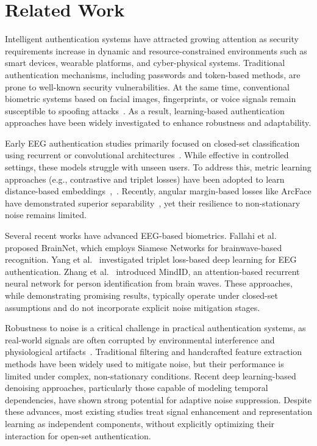 \documentclass[conference]{IEEEtran}
\begin{document}
\section{Related Work}

Intelligent authentication systems have attracted growing attention as security requirements increase in dynamic and resource-constrained environments such as smart devices, wearable platforms, and cyber-physical systems. Traditional authentication mechanisms, including passwords and token-based methods, are prone to well-known security vulnerabilities. At the same time, conventional biometric systems based on facial images, fingerprints, or voice signals remain susceptible to spoofing attacks~\cite{b1}. As a result, learning-based authentication approaches have been widely investigated to enhance robustness and adaptability.

Early EEG authentication studies primarily focused on closed-set classification using recurrent or convolutional architectures~\cite{b3}. While effective in controlled settings, these models struggle with unseen users. To address this, metric learning approaches (e.g., contrastive and triplet losses) have been adopted to learn distance-based embeddings~\cite{b5},~\cite{b6}. Recently, angular margin-based losses like ArcFace have demonstrated superior separability~\cite{b7}, yet their resilience to non-stationary noise remains limited.

Several recent works have advanced EEG-based biometrics. Fallahi et al.~\cite{b1} proposed BrainNet, which employs Siamese Networks for brainwave-based recognition. Yang et al.~\cite{b2} investigated triplet loss-based deep learning for EEG authentication. Zhang et al.~\cite{b3} introduced MindID, an attention-based recurrent neural network for person identification from brain waves. These approaches, while demonstrating promising results, typically operate under closed-set assumptions and do not incorporate explicit noise mitigation stages.

Robustness to noise is a critical challenge in practical authentication systems, as real-world signals are often corrupted by environmental interference and physiological artifacts~\cite{b4}. Traditional filtering and handcrafted feature extraction methods have been widely used to mitigate noise, but their performance is limited under complex, non-stationary conditions. Recent deep learning-based denoising approaches, particularly those capable of modeling temporal dependencies, have shown strong potential for adaptive noise suppression. Despite these advances, most existing studies treat signal enhancement and representation learning as independent components, without explicitly optimizing their interaction for open-set authentication.
\end{document}
